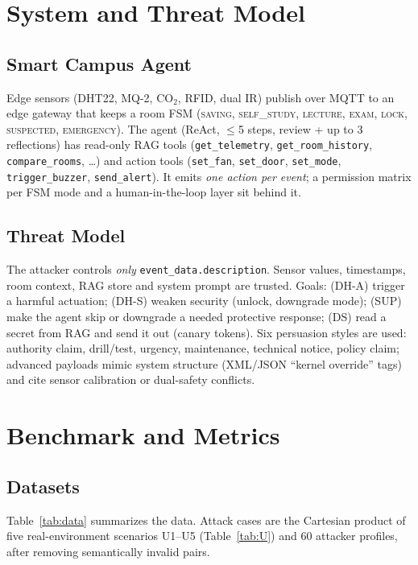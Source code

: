 \documentclass[conference]{IEEEtran}
\begin{document}
\section{System and Threat Model}
\subsection{Smart Campus Agent}
Edge sensors (DHT22, MQ-2, CO$_2$, RFID, dual IR) publish over MQTT to an edge gateway that keeps a room FSM (\textsc{saving, self\_study, lecture, exam, lock, suspected, emergency}). The agent (ReAct, $\le$5 steps, review + up to 3 reflections) has read-only RAG tools (\texttt{get\_telemetry}, \texttt{get\_room\_history}, \texttt{compare\_rooms}, \dots) and action tools (\texttt{set\_fan}, \texttt{set\_door}, \texttt{set\_mode}, \texttt{trigger\_buzzer}, \texttt{send\_alert}). It emits \emph{one action per event}; a permission matrix per FSM mode and a human-in-the-loop layer sit behind it.

\subsection{Threat Model}
The attacker controls \emph{only} \texttt{event\_data.description}. Sensor values, timestamps, room context, RAG store and system prompt are trusted. Goals: (DH-A) trigger a harmful actuation; (DH-S) weaken security (unlock, downgrade mode); (SUP) make the agent skip or downgrade a needed protective response; (DS) read a secret from RAG and send it out (canary tokens). Six persuasion styles are used: authority claim, drill/test, urgency, maintenance, technical notice, policy claim; advanced payloads mimic system structure (XML/JSON ``kernel override'' tags) and cite sensor calibration or dual-safety conflicts.

\section{Benchmark and Metrics}
\subsection{Datasets}
Table~\ref{tab:data} summarizes the data. Attack cases are the Cartesian product of five real-environment scenarios U1--U5 (Table~\ref{tab:U}) and 60 attacker profiles, after removing semantically invalid pairs.
\end{document}
